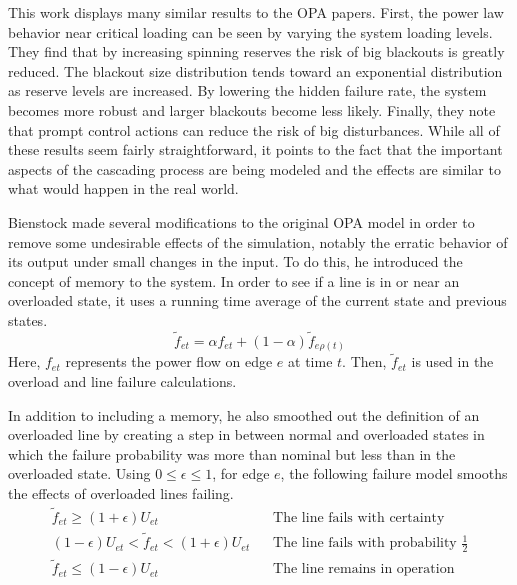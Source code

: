 This work displays many similar results to the OPA papers.  First, the power law behavior near critical loading can be seen by varying the system loading levels.  They find that by increasing spinning reserves the risk of big blackouts is greatly reduced.  The blackout size distribution tends toward an exponential distribution as reserve levels are increased.  By lowering the hidden failure rate, the system becomes more robust and larger blackouts become less likely.  Finally, they note that prompt control actions can reduce the risk of big disturbances.  While all of these results seem fairly straightforward, it points to the fact that the important aspects of the cascading process are being modeled and the effects are similar to what would happen in the real world.

Bienstock made several modifications \cite{bienstock_2011} to the original OPA model in order to remove some undesirable effects of the simulation, notably the erratic behavior of its output under small changes in the input.  To do this, he introduced the concept of memory to the system.  In order to see if a line is in or near an overloaded state, it uses a running time average of the current state and previous states.
\begin{equation}
\tilde{f}_{et} = \alpha f_{et} + (1-\alpha) \tilde{f}_{e\rho(t)}
\end{equation} 
Here, $f_{et}$ represents the power flow on edge $e$ at time $t$.  Then, $\tilde{f}_{et}$ is used in the overload and line failure calculations.

In addition to including a memory, he also smoothed out the definition of an overloaded line by creating a step in between normal and overloaded states in which the failure probability was more than nominal but less than in the overloaded state.  Using $0 \le \epsilon \le 1$, for edge $e$, the following failure model smooths the effects of overloaded lines failing.
\begin{align}
\tilde{f}_{et} \ge (1+\epsilon) U_{et}			&	\hspace{10pt} \mbox{The line fails with certainty} 	\\
(1-\epsilon) U_{et} < \tilde{f}_{et} < (1+\epsilon) U_{et}	&	\hspace{10pt} \mbox{The line fails with probability }\frac{1}{2} 	\\
\tilde{f}_{et} \le (1-\epsilon) U_{et}			&	\hspace{10pt} \mbox{The line remains in operation} 
\end{align}

